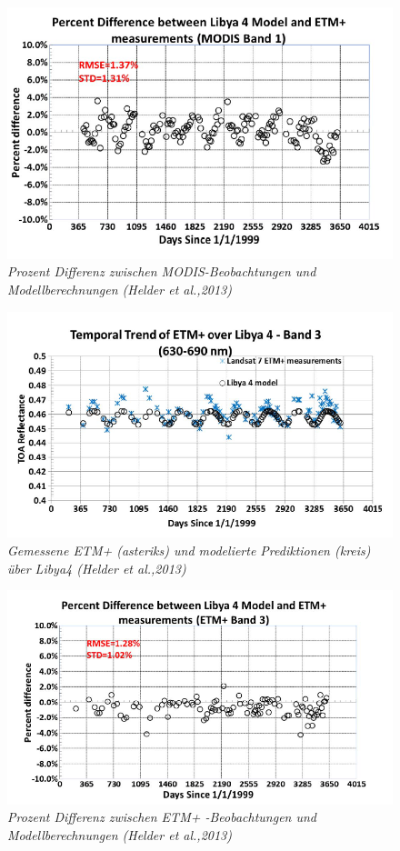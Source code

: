 \documentclass[11pt]{report}
\begin{document}
\begin{figure}[H]
\centering
\includegraphics[scale=0.6]{./Grafiken/Abscal/prozent_diff_zw_lyb4model_und_MODIS.PNG}
\caption{\textit{Prozent Differenz zwischen MODIS-Beobachtungen und Modellberechnungen  (Helder et al.,2013)}}
\end{figure}

\begin{figure}[H]
\centering
\includegraphics[scale=0.6]{./Grafiken/Abscal/temporaler_Trend_vonETMplus_Libya4.PNG}
\caption{\textit{Gemessene ETM+ (asteriks) und modelierte Prediktionen (kreis) über Libya4  (Helder et al.,2013)}}
\end{figure}

\begin{figure}[H]
\centering
\includegraphics[scale=0.6]{./Grafiken/Abscal/prozent_diff_zw_lyb4model_und_ETMplus.PNG}
\caption{\textit{Prozent Differenz zwischen ETM+ -Beobachtungen und Modellberechnungen  (Helder et al.,2013)}}
\end{figure}
\end{document}
